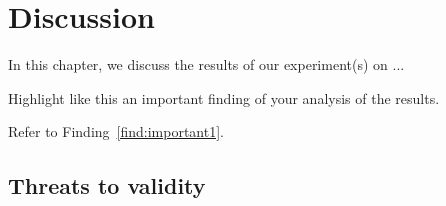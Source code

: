 \chapter{Discussion}\label{ch:Discussion}
In this chapter, we discuss the results of our experiment(s) on ...

\begin{finding}
	Highlight like this an important finding of your analysis of the results.
	\label{find:important1}
\end{finding}

Refer to Finding~\ref{find:important1}.

\section{Threats to validity}
